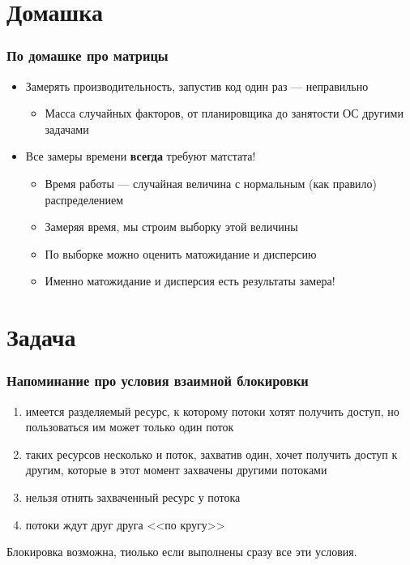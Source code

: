 \documentclass{../../slides-style}
\begin{document}
    \begin{frame}[plain]
        \titlepage
    \end{frame}

    \section{Домашка}

    \begin{frame}
        \frametitle{По домашке про матрицы}
        \begin{itemize}
            \item Замерять производительность, запустив код один раз --- неправильно
            \begin{itemize}
                \item Масса случайных факторов, от планировщика до занятости ОС другими задачами
            \end{itemize}
            \item Все замеры времени \textbf{всегда} требуют матстата!
            \begin{itemize}
                \item Время работы --- случайная величина с нормальным (как правило) распределением
                \item Замеряя время, мы строим выборку этой величины
                \item По выборке можно оценить матожидание и дисперсию
                \item Именно матожидание и дисперсия есть результаты замера!
            \end{itemize}
        \end{itemize}
    \end{frame}

    \section{Задача}

    \begin{frame}
        \frametitle{Напоминание про условия взаимной блокировки}
        \begin{enumerate}
            \item имеется разделяемый ресурс, к которому потоки хотят получить доступ, но пользоваться им может только один поток
            \item таких ресурсов несколько и поток, захватив один, хочет получить доступ к другим, которые в этот момент захвачены другими потоками
            \item нельзя отнять захваченный ресурс у потока
            \item потоки ждут друг друга <<по кругу>>
        \end{enumerate}
        Блокировка возможна, тиолько если выполнены сразу все эти условия.
    \end{frame}
\end{document}
